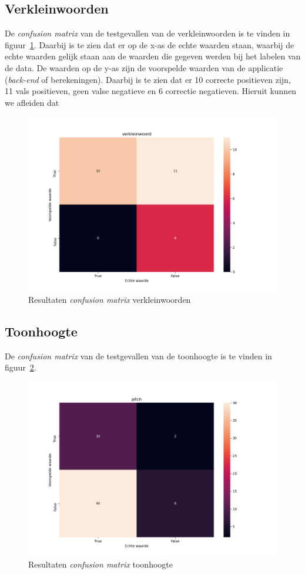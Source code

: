 \subsection{Verkleinwoorden}
De \textit{confusion matrix} van de testgevallen van de verkleinwoorden is te vinden in figuur~\ref{fig:cfm_verkleinwoord}. Daarbij is te zien dat er op de x-as de echte waarden staan, waarbij de echte waarden gelijk staan aan de waarden die gegeven werden bij het labelen van de data. De waarden op de y-as zijn de voorspelde waarden van de applicatie (\textit{back-end} of berekeningen). Daarbij is te zien dat er 10 correcte positieven zijn, 11 vals positieven, geen valse negatieve en 6 correctie negatieven.
Hieruit kunnen we afleiden dat %
\begin{figure}
	\centering
	\includegraphics[width=1\textwidth]{./img/cfm_verkleinwoord}
	\caption{\label{fig:cfm_verkleinwoord} Resultaten \textit{confusion matrix} verkleinwoorden}
\end{figure}


\subsection{Toonhoogte}
De \textit{confusion matrix} van de testgevallen van de toonhoogte is te vinden in figuur~\ref{fig:cfm_pitch}.
\begin{figure}
	\centering
	\includegraphics[width=1\textwidth]{./img/cfm_pitch}
	\caption{\label{fig:cfm_pitch} Resultaten \textit{confusion matrix} toonhoogte}
\end{figure}

